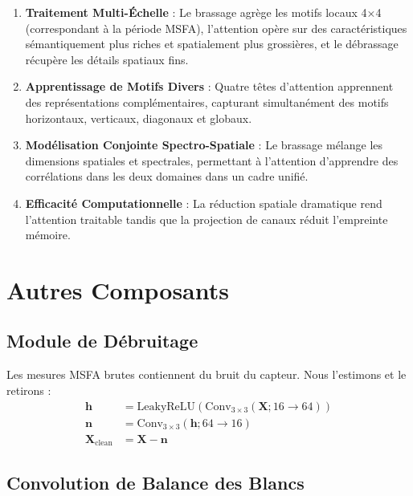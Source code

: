 \documentclass[conference]{IEEEtran}
\begin{document}
\begin{enumerate}
    \item \textbf{Traitement Multi-Échelle} : Le brassage agrège les motifs locaux 4×4 (correspondant à la période MSFA), l'attention opère sur des caractéristiques sémantiquement plus riches et spatialement plus grossières, et le débrassage récupère les détails spatiaux fins.
    
    \item \textbf{Apprentissage de Motifs Divers} : Quatre têtes d'attention apprennent des représentations complémentaires, capturant simultanément des motifs horizontaux, verticaux, diagonaux et globaux.
    
    \item \textbf{Modélisation Conjointe Spectro-Spatiale} : Le brassage mélange les dimensions spatiales et spectrales, permettant à l'attention d'apprendre des corrélations dans les deux domaines dans un cadre unifié.
    
    \item \textbf{Efficacité Computationnelle} : La réduction spatiale dramatique rend l'attention traitable tandis que la projection de canaux réduit l'empreinte mémoire.
\end{enumerate}

\section{Autres Composants}

\subsection{Module de Débruitage}

Les mesures MSFA brutes contiennent du bruit du capteur. Nous l'estimons et le retirons :
\begin{equation}
\begin{aligned}
\mathbf{h} &= \text{LeakyReLU}(\text{Conv}_{3\times3}(\mathbf{X}; 16 \rightarrow 64)) \\
\mathbf{n} &= \text{Conv}_{3\times3}(\mathbf{h}; 64 \rightarrow 16) \\
\mathbf{X}_{\text{clean}} &= \mathbf{X} - \mathbf{n}
\end{aligned}
\end{equation}

\subsection{Convolution de Balance des Blancs}
\end{document}
